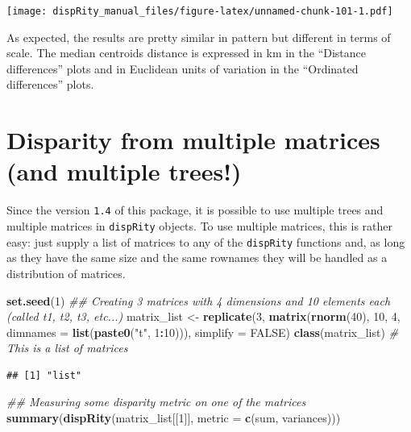 \documentclass[]{book}
\newenvironment{Shaded}{\begin{snugshade}}{\end{snugshade}}
\newcommand{\CommentTok}[1]{\textcolor[rgb]{0.56,0.35,0.01}{\textit{#1}}}
\newcommand{\DataTypeTok}[1]{\textcolor[rgb]{0.13,0.29,0.53}{#1}}
\newcommand{\DecValTok}[1]{\textcolor[rgb]{0.00,0.00,0.81}{#1}}
\newcommand{\KeywordTok}[1]{\textcolor[rgb]{0.13,0.29,0.53}{\textbf{#1}}}
\newcommand{\NormalTok}[1]{#1}
\newcommand{\OperatorTok}[1]{\textcolor[rgb]{0.81,0.36,0.00}{\textbf{#1}}}
\newcommand{\OtherTok}[1]{\textcolor[rgb]{0.56,0.35,0.01}{#1}}
\newcommand{\StringTok}[1]{\textcolor[rgb]{0.31,0.60,0.02}{#1}}
\begin{document}
\texttt{[image: dispRity\_manual\_files/figure-latex/unnamed-chunk-101-1.pdf]}

As expected, the results are pretty similar in pattern but different in terms of scale.
The median centroids distance is expressed in km in the ``Distance differences'' plots and in Euclidean units of variation in the ``Ordinated differences'' plots.

\hypertarget{multi.input}{%
\section{Disparity from multiple matrices (and multiple trees!)}\label{multi.input}}

Since the version \texttt{1.4} of this package, it is possible to use multiple trees and multiple matrices in \texttt{dispRity} objects.
To use multiple matrices, this is rather easy: just supply a list of matrices to any of the \texttt{dispRity} functions and, as long as they have the same size and the same rownames they will be handled as a distribution of matrices.

\begin{Shaded}
\begin{Highlighting}[]
\KeywordTok{set.seed}\NormalTok{(}\DecValTok{1}\NormalTok{)}
\CommentTok{## Creating 3 matrices with 4 dimensions and 10 elements each (called t1, t2, t3, etc...)}
\NormalTok{matrix_list <-}\StringTok{ }\KeywordTok{replicate}\NormalTok{(}\DecValTok{3}\NormalTok{, }\KeywordTok{matrix}\NormalTok{(}\KeywordTok{rnorm}\NormalTok{(}\DecValTok{40}\NormalTok{), }\DecValTok{10}\NormalTok{, }\DecValTok{4}\NormalTok{, }\DataTypeTok{dimnames =} \KeywordTok{list}\NormalTok{(}\KeywordTok{paste0}\NormalTok{(}\StringTok{"t"}\NormalTok{, }\DecValTok{1}\OperatorTok{:}\DecValTok{10}\NormalTok{))),}
                         \DataTypeTok{simplify =} \OtherTok{FALSE}\NormalTok{)}
\KeywordTok{class}\NormalTok{(matrix_list) }\CommentTok{# This is a list of matrices}
\end{Highlighting}
\end{Shaded}

\begin{verbatim}
## [1] "list"
\end{verbatim}

\begin{Shaded}
\begin{Highlighting}[]
\CommentTok{## Measuring some disparity metric on one of the matrices}
\KeywordTok{summary}\NormalTok{(}\KeywordTok{dispRity}\NormalTok{(matrix_list[[}\DecValTok{1}\NormalTok{]], }\DataTypeTok{metric =} \KeywordTok{c}\NormalTok{(sum, variances)))}
\end{Highlighting}
\end{Shaded}
\end{document}
